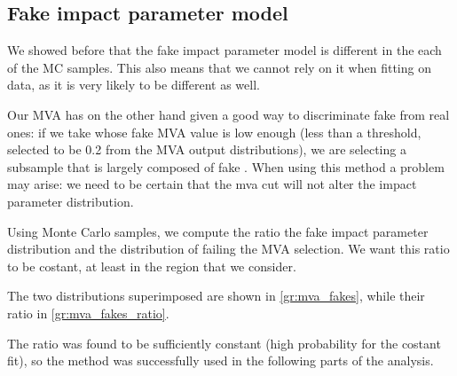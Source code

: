 \subsection{Fake \Pgm impact parameter model}
\label{subsec:fake_model}

We showed before that the fake \Pgm impact parameter model is different in the each of the MC samples. 
This also means that we cannot rely on it when fitting on data, as it is very likely to be different as well.

Our MVA has on the other hand given a good way to discriminate fake \Pgm from real ones: if we take \Pgm whose fake MVA value is low enough (less than a threshold, selected to be 0.2 from the MVA output distributions), we are selecting a subsample that is largely composed of fake \Pgm.
When using this method a problem may arise: we need to be certain that the mva cut will not alter the impact parameter distribution.

Using Monte Carlo samples, we compute the ratio the fake impact parameter distribution and the distribution of \Pgm failing the MVA selection.
We want this ratio to be costant, at least in the \dxy region that we consider.

The two distributions superimposed are shown in \autoref{gr:mva_fakes}, while their ratio in \autoref{gr:mva_fakes_ratio}.


The ratio was found to be sufficiently constant (high probability for the costant fit), so the method was successfully used in the following parts of the analysis.
